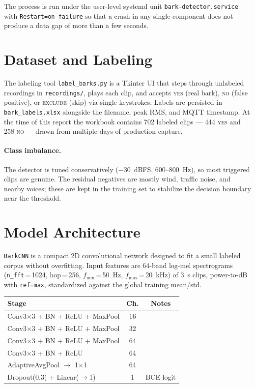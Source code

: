 \documentclass[10pt,twocolumn]{article}
\begin{document}
The process is run under the user-level systemd unit
\texttt{bark-detector.service} with \texttt{Restart=on-failure} so that
a crash in any single component does not produce a data gap of more
than a few seconds.

\section{Dataset and Labeling}
The labeling tool \texttt{label\_barks.py} is a Tkinter UI that steps
through unlabeled recordings in \texttt{recordings/}, plays each clip,
and accepts \textsc{yes} (real bark), \textsc{no} (false positive), or
\textsc{exclude} (skip) via single keystrokes. Labels are persisted in
\texttt{bark\_labels.xlsx} alongside the filename, peak RMS, and MQTT
timestamp. At the time of this report the workbook contains
\num{702} labeled clips --- \num{444} \textsc{yes} and \num{258}
\textsc{no} --- drawn from multiple days of production capture.

\paragraph{Class imbalance.} The detector is tuned conservatively
(\SI{-30}{dBFS}, \SI{600}{}--\SI{800}{Hz}), so most triggered clips
are genuine. The residual negatives are mostly wind, traffic noise,
and nearby voices; these are kept in the training set to stabilize
the decision boundary near the threshold.

\section{Model Architecture}
\texttt{BarkCNN} is a compact 2D convolutional network designed to fit
a small labeled corpus without overfitting. Input features are
\num{64}-band log-mel spectrograms
(\texttt{n\_fft}\,=\,\num{1024}, hop\,=\,\num{256}, $f_\text{min}$\,=\,\SI{50}{Hz},
$f_\text{max}$\,=\,\SI{20}{kHz}) of \SI{3}{s} clips, power-to-dB with
\texttt{ref=max}, standardized against the global training mean/std.

\begin{center}
\small
\begin{tabular}{@{}lcc@{}}
\toprule
Stage & Ch. & Notes \\
\midrule
Conv3$\times$3 + BN + ReLU + MaxPool & 16 & \\
Conv3$\times$3 + BN + ReLU + MaxPool & 32 & \\
Conv3$\times$3 + BN + ReLU + MaxPool & 64 & \\
Conv3$\times$3 + BN + ReLU           & 64 & \\
AdaptiveAvgPool $\to$ 1$\times$1     & 64 & \\
Dropout(0.3) + Linear($\to$1)        & 1  & BCE logit \\
\bottomrule
\end{tabular}
\end{center}
\end{document}
